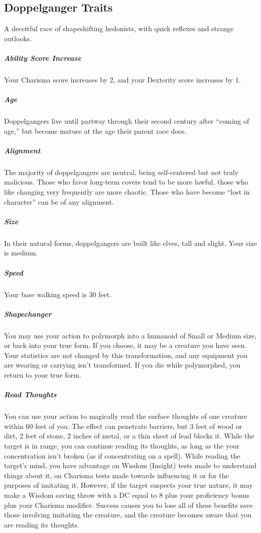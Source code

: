 \subsection{Doppelganger Traits \cite{d-hb}}
A deceitful race of shapeshifting hedonists, with quick reflexes and strange outlooks.

\subparagraph{Ability Score Increase}
{Your Charisma score increases by 2, and your Dexterity score increases by 1.}

\subparagraph{Age}
{Doppelgangers live until partway through their second century after “coming of age,” but become mature at the age their parent race does.}

\subparagraph{Alignment}
{The majority of doppelgangers are neutral, being self-centered but not truly malicious. Those who favor long-term covers tend to be more lawful, those who like changing very frequently are more chaotic. Those who have become “lost in character” can be of any alignment.}

\subparagraph{Size}
{In their natural forms, doppelgangers are built like elves, tall and slight. Your size is medium.}

\subparagraph{Speed}
{Your base walking speed is 30 feet.}

\subparagraph{Shapechanger}
{You may use your action to polymorph into a humanoid of Small or Medium size, or back into your true form. If you choose, it may be a creature you have seen. Your statistics are not changed by this transformation, and any equipment you are wearing or carrying isn’t transformed. If you die while polymorphed, you return to your true form.}

\subparagraph{Read Thoughts}
{You can use your action to magically read the surface thoughts of one creature within 60 feet of you. The effect can penetrate barriers, but 3 feet of wood or dirt, 2 feet of stone, 2 inches of metal, or a thin sheet of lead blocks it. While the target is in range, you can continue reading its thoughts, as long as the your concentration isn’t broken (as if concentrating on a spell). While reading the target’s mind, you have advantage on Wisdom (Insight) tests made to understand things about it, on Charisma tests made towards influencing it or for the purposes of imitating it. However, if the target suspects your true nature, it may make a Wisdom saving throw with a DC equal to 8 plus your proficiency bonus plus your Charisma modifier. Success causes you to lose all of these benefits save those involving imitating the creature, and the creature becomes aware that you are reading its thoughts.}

